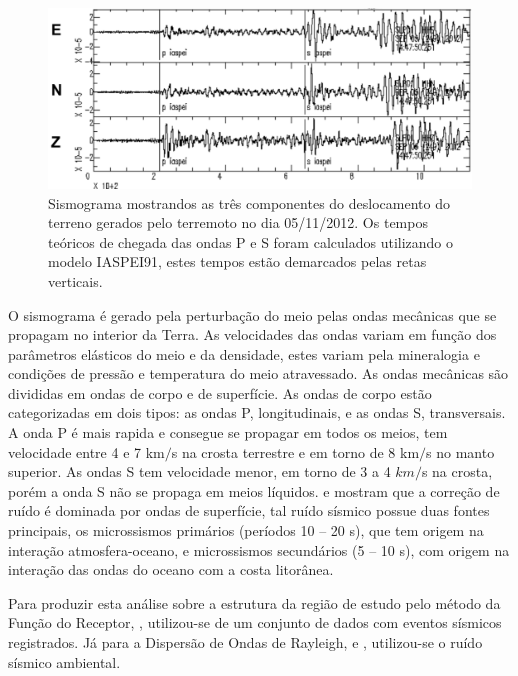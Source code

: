 \begin{figure}[!ht]
\centering
\includegraphics[scale=0.6]{Figs/sismograma.png}
\caption{Sismograma mostrandos as três componentes do deslocamento do terreno gerados pelo terremoto no dia 05/11/2012. Os tempos teóricos de chegada das ondas P e S foram calculados utilizando o modelo IASPEI91, estes tempos estão demarcados pelas retas verticais.}
\label{simograma}
\end{figure}

O sismograma é gerado pela perturbação do meio pelas ondas  mecânicas que se propagam no interior da Terra. As velocidades das ondas variam em função dos parâmetros elásticos do meio e da densidade, estes variam pela mineralogia e condições de pressão e temperatura do meio atravessado. As ondas mecânicas são divididas em ondas de corpo e de superfície. As ondas de corpo estão categorizadas em dois tipos: as ondas P, longitudinais, e as ondas S, transversais. A onda P é mais rapida e consegue se propagar em todos os meios, tem velocidade entre 4 e 7 km$/$s na crosta terrestre e em torno de 8 km$/$s no manto superior. As ondas S tem velocidade menor, em torno de 3 a 4 $km/$s na crosta, porém a onda S não se propaga em meios líquidos. \cite{campillo_long-range_2003} e \cite{shapiro_emergence_2004} mostram que a correção de ruído é dominada por ondas de superfície, tal ruído sísmico possue duas fontes principais, os microssismos primários (períodos 10 – 20 s), que tem origem na interação atmosfera-oceano, e microssismos secundários (5  – 10 s), com origem na interação das ondas do oceano com a costa litorânea.

Para produzir esta análise sobre a estrutura da região de estudo pelo método da Função do Receptor, \cite{langston_structure_1979}, utilizou-se de um conjunto de dados com eventos sísmicos registrados. Já para a Dispersão de Ondas de Rayleigh, \cite{campillo_long-range_2003} e \cite{shapiro_emergence_2004}, utilizou-se o ruído sísmico ambiental.

